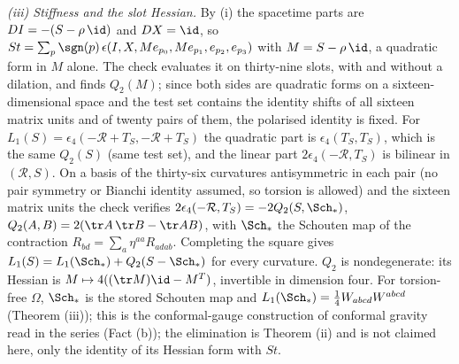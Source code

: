 \emph{(iii) Stiffness and the slot Hessian.} By (i) the spacetime parts are $DI = -(S - \rho\,\id)$ and $DX = \id$, so $St = \sum_{p}\sgn(p)\,\epsilon(I, X, M e_{p_{0}}, M e_{p_{1}}, e_{p_{2}}, e_{p_{3}})$ with $M = S - \rho\,\id$, a quadratic form in $M$ alone. The check evaluates it on thirty-nine slots, with and without a dilation, and finds $Q_{2}(M)$; since both sides are quadratic forms on a sixteen-dimensional space and the test set contains the identity shifts of all sixteen matrix units and of twenty pairs of them, the polarised identity is fixed. For $L_{1}(S) = \epsilon_{4}(-\mathcal{R} + T_{S}, -\mathcal{R} + T_{S})$ the quadratic part is $\epsilon_{4}(T_{S}, T_{S})$, which is the same $Q_{2}(S)$ (same test set), and the linear part $2\epsilon_{4}(-\mathcal{R}, T_{S})$ is bilinear in $(\mathcal{R}, S)$. On a basis of the thirty-six curvatures antisymmetric in each pair (no pair symmetry or Bianchi identity assumed, so torsion is allowed) and the sixteen matrix units the check verifies $2\epsilon_{4}(-\mathcal{R}, T_{S}) = -2Q_{2}(S, \Sch_{*})$, $Q_{2}(A, B) = 2(\tr A\,\tr B - \tr AB)$, with $\Sch_{*}$ the Schouten map of the contraction $R_{bd} = \sum_{a}\eta^{aa}R_{adab}$. Completing the square gives $L_{1}(S) = L_{1}(\Sch_{*}) + Q_{2}(S - \Sch_{*})$ for every curvature. $Q_{2}$ is nondegenerate: its Hessian is $M \mapsto 4((\tr M)\id - M^{T})$, invertible in dimension four. For torsion-free $\Omega$, $\Sch_{*}$ is the stored Schouten map and $L_{1}(\Sch_{*}) = \tfrac14 W_{abcd}W^{abcd}$ (Theorem (iii)); this is the conformal-gauge construction of conformal gravity read in the series (Fact (b)); the elimination is Theorem (ii) and is not claimed here, only the identity of its Hessian form with $St$.

